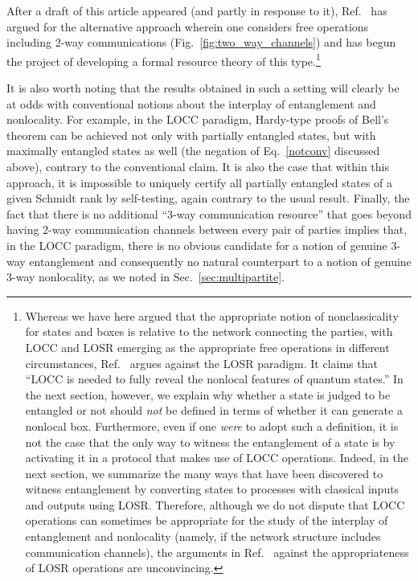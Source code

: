 \documentclass[12pt]{article}
\newcommand{\rob}{\color{black}}
\newcommand{\blk}{\color{black}}
\theoremstyle{plain}
\theoremstyle{definition}
\begin{document}
After a draft of this article appeared (and partly in response to it), Ref.~\cite{Gour2020RT} has argued for 
\rob the alternative approach wherein one considers free operations including 2-way communications (Fig.~\ref{fig:two_way_channels}) \blk
 and has begun the project of developing a formal resource theory of this type.\footnote{Whereas we have here argued that the appropriate notion of nonclassicality for states and boxes is relative to the network connecting the parties, with LOCC and LOSR emerging as the appropriate free operations in different circumstances, Ref.~\cite{Gour2020RT} argues against the LOSR paradigm.  It claims that \enquote{LOCC is needed to fully reveal the nonlocal features of quantum states.}  In the next section, however, we explain why whether a state  is judged to be entangled or not should {\em not} be defined in terms of whether it can generate a nonlocal box.  Furthermore, even if one {\em were} to adopt such a definition, it is not the case that the only way to witness the entanglement of a state is by activating it in a protocol that makes use of  LOCC operations.  Indeed, in the next section, we summarize the many ways that have been discovered to witness entanglement by converting states to processes with classical inputs and outputs using LOSR. 
Therefore, although we do not dispute that LOCC operations can sometimes be appropriate for the study of the interplay of entanglement and nonlocality (namely, if the network structure includes communication channels),
the arguments in Ref.~\cite{Gour2020RT} against the appropriateness of LOSR operations are unconvincing.
}


It is also worth noting that the results obtained in such a setting will clearly 
be at odds with conventional notions about the interplay of entanglement and nonlocality.  
For example, in the LOCC paradigm, Hardy-type proofs of Bell's theorem can be achieved not only with partially entangled states, but with maximally entangled states as well (the negation of Eq.~\eqref{notconv} discussed above), contrary to the conventional claim.
It is also the case that within this approach, it is impossible to uniquely certify all partially entangled states of a given Schmidt rank by self-testing, again contrary to the usual result. 
Finally, the fact that there is no additional ``3-way communication resource'' that goes beyond having
2-way communication channels between every pair of parties
 implies that, in the LOCC paradigm, there is no obvious candidate for a notion of genuine 3-way entanglement and consequently no natural counterpart to a notion of genuine 3-way nonlocality,  as we noted in  Sec.~\ref{sec:multipartite}.
\end{document}
